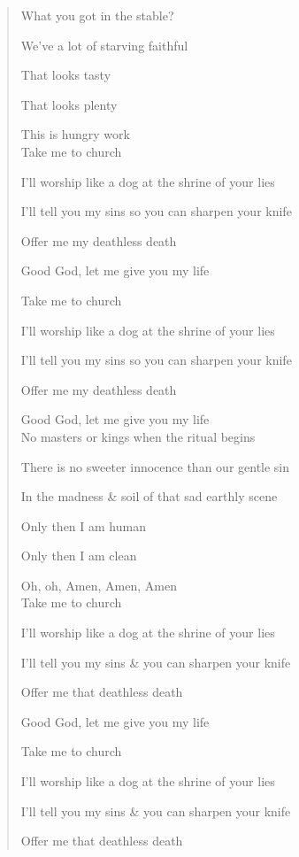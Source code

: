 \documentclass{article}
\begin{document}
\begin{enumerate}
\begin{quotation}
		What you got in the stable?
		
		We've a lot of starving faithful
		
		That looks tasty
		
		That looks plenty
		
		This is hungry work
		\\
		
		Take me to church
		
		I'll worship like a dog at the shrine of your lies
		
		I'll tell you my sins so you can sharpen your knife
		
		Offer me my deathless death
		
		Good God, let me give you my life
		
		Take me to church
		
		I'll worship like a dog at the shrine of your lies
		
		I'll tell you my sins so you can sharpen your knife
		
		Offer me my deathless death
		
		Good God, let me give you my life
		\\
		
		No masters or kings when the ritual begins
		
		There is no sweeter innocence than our gentle sin
		
		In the madness \& soil of that sad earthly scene
		
		Only then I am human
		
		Only then I am clean
		
		Oh, oh, Amen, Amen, Amen
		\\
		
		Take me to church
		
		I'll worship like a dog at the shrine of your lies
		
		I'll tell you my sins \& you can sharpen your knife
		
		Offer me that deathless death
		
		Good God, let me give you my life
		
		Take me to church
		
		I'll worship like a dog at the shrine of your lies
		
		I'll tell you my sins \& you can sharpen your knife
		
		Offer me that deathless death
		

\end{quotation}
\end{enumerate}
\end{document}
